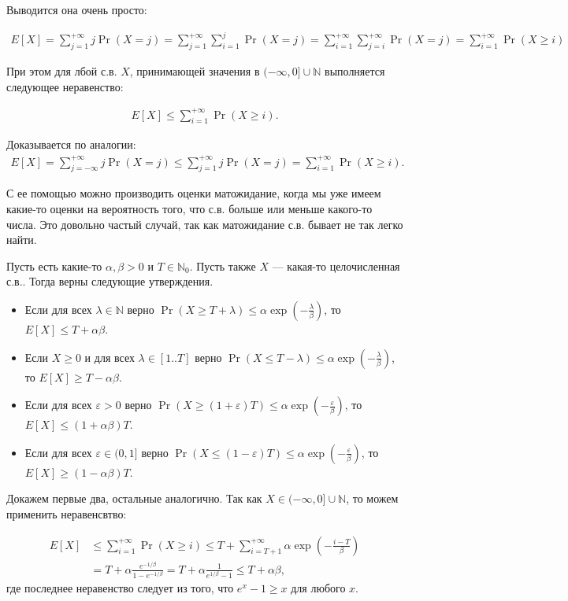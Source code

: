 \documentclass[12pt]{article}
\newcommand\N{\mathbb{N}}
\newcommand\eps{\varepsilon}
\begin{document}
Выводится она очень просто:

\begin{align*}
  E[X] = \sum_{j = 1}^{+\infty} j \Pr(X = j) = \sum_{j = 1}^{+\infty} \sum_{i = 1}^{j} \Pr(X = j) = \sum_{i = 1}^{+\infty} \sum_{j = i}^{+\infty} \Pr(X = j) = \sum_{i = 1}^{+\infty} \Pr(X \ge i)
\end{align*}

При этом для лбой с.в. $X$, принимающей значения в $(-\infty, 0] \cup \N$ выполняется следующее неравенство:

\begin{align*}
  E[X] \le \sum_{i = 1}^{+\infty} \Pr(X \ge i).
\end{align*}

Доказывается по аналогии:
\begin{align*}
  E[X] = \sum_{j = -\infty}^{+\infty} j \Pr(X = j) \le \sum_{j = 1}^{+\infty} j \Pr(X = j) = \sum_{i = 1}^{+\infty} \Pr(X \ge i).
\end{align*}

С ее помощью можно производить оценки матожидание, когда мы уже имеем какие-то оценки на вероятность того, что с.в. больше или меньше какого-то числа. Это довольно частый случай, так как матожидание с.в. бывает не так легко найти.

Пусть есть какие-то $\alpha, \beta > 0$ и $T \in \N_0$. Пусть также $X$ --- какая-то целочисленная с.в.. Тогда верны следующие утверждения.

\begin{itemize}
  \item Если для всех $\lambda \in \N$ верно $\Pr(X \ge T + \lambda) \le \alpha \exp(-\frac{\lambda}{\beta})$, то $E[X] \le T + \alpha\beta$.
  \item Если $X \ge 0$ и для всех $\lambda \in [1..T]$ верно $\Pr(X \le T - \lambda) \le \alpha \exp(-\frac{\lambda}{\beta})$, то $E[X] \ge T - \alpha\beta$.
  \item Если для всех $\eps > 0$ верно $\Pr(X \ge (1 + \eps)T) \le \alpha \exp(-\frac{\eps}{\beta})$, то $E[X] \le (1 + \alpha\beta)T$.
  \item Если для всех $\eps \in (0, 1]$ верно $\Pr(X \le (1 -\eps)T) \le \alpha \exp(-\frac{\eps}{\beta})$, то $E[X] \ge (1 - \alpha\beta)T$.
\end{itemize}

Докажем первые два, остальные аналогично. Так как $X \in (-\infty, 0] \cup \N$, то можем применить неравенсвтво:

\begin{align*}
  E[X] &\le \sum_{i = 1}^{+\infty} \Pr(X \ge i) \le T + \sum_{i = T + 1}^{+\infty} \alpha \exp\left(-\frac{i - T}{\beta}\right) \\
       &= T + \alpha \frac{e^{-1/\beta}}{1 - e^{-1/\beta}} = T + \alpha \frac{1}{e^{1/\beta} - 1} \le T + \alpha\beta,
\end{align*}
где последнее неравенство следует из того, что $e^x - 1 \ge x$ для любого $x$.
\end{document}
